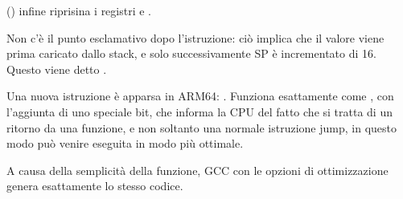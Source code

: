  () infine riprisina i registri  e .

Non c'è il punto esclamativo dopo l'istruzione: ciò implica che il valore viene prima caricato dallo stack, e solo successivamente
\ac{SP} è incrementato di 16.
Questo viene detto .

Una nuova istruzione è apparsa in ARM64: \RET.
Funziona esattamente come , con l'aggiunta di uno speciale  bit, che informa la \ac{CPU}
del fatto che si tratta di un ritorno da una funzione, e non soltanto una normale istruzione jump, in questo modo
può venire eseguita in modo più ottimale.

A causa della semplicità della funzione, GCC con le opzioni di ottimizzazione genera esattamente lo stesso codice.
